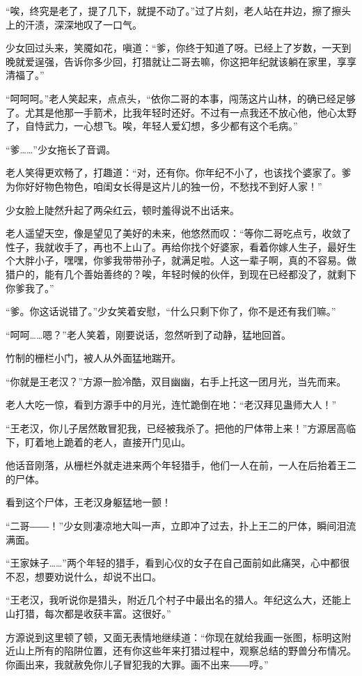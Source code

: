 \begin{this_body}
“唉，终究是老了，提了几下，就提不动了。”过了片刻，老人站在井边，擦了擦头上的汗渍，深深地叹了一口气。

少女回过头来，笑魇如花，嗔道：“爹，你终于知道了呀。已经上了岁数，一天到晚就爱逞强，告诉你多少回，打猎就让二哥去嘛，你这把年纪就该躺在家里，享享清福了。”

“呵呵呵。”老人笑起来，点点头，“依你二哥的本事，闯荡这片山林，的确已经足够了。尤其是他那一手箭术，比我年轻时还好。不过有一点我还不放心他，他心太野了，自恃武力，一心想飞。唉，年轻人爱幻想，多少都有这个毛病。”

“爹……”少女拖长了音调。

老人笑得更欢畅了，打趣道：“对，还有你。你年纪不小了，也该找个婆家了。爹为你好好物色物色，咱闺女长得是这片儿的独一份，不愁找不到好人家！”

少女脸上陡然升起了两朵红云，顿时羞得说不出话来。

老人遥望天空，像是望见了美好的未来，他悠然而叹：“等你二哥吃点亏，收敛了性子，我就收手了，再也不上山了。再给你找个好婆家，看着你嫁人生子，最好生个大胖小子，嘿嘿，你爹我带带孙子，就满足啦。人这一辈子啊，真的不容易。做猎户的，能有几个善始善终的？唉，年轻时候的伙伴，到现在已经都没了，就剩下你爹我了。”

“爹。你这话说错了。”少女笑着安慰，“什么只剩下你了，你不是还有我们嘛。”

“呵呵……嗯？”老人笑着，刚要说话，忽然听到了动静，猛地回首。

竹制的栅栏小门，被人从外面猛地踹开。

“你就是王老汉？”方源一脸冷酷，双目幽幽，右手上托这一团月光，当先而来。

老人大吃一惊，看到方源手中的月光，连忙跪倒在地：“老汉拜见蛊师大人！”

“王老汉，你儿子居然敢冒犯我，已经被我杀了。把他的尸体带上来！”方源居高临下，盯着地上跪着的老人，直接开门见山。

他话音刚落，从栅栏外就走进来两个年轻猎手，他们一人在前，一人在后抬着王二的尸体。

看到这个尸体，王老汉身躯猛地一颤！

“二哥――！”少女则凄凉地大叫一声，立即冲了过去，扑上王二的尸体，瞬间泪流满面。

“王家妹子……”两个年轻的猎手，看到心仪的女子在自己面前如此痛哭，心中都很不忍，想要劝说什么，却说不出口。

“王老汉，我听说你是猎头，附近几个村子中最出名的猎人。年纪这么大，还能上山打猎，每次都是收获丰富。这很好。”

方源说到这里顿了顿，又面无表情地继续道：“你现在就给我画一张图，标明这附近山上所有的陷阱位置，还有你这些年来打猎过程中，观察总结的野兽分布情况。你画出来，我就赦免你儿子冒犯我的大罪。画不出来――哼。”


\end{this_body}
